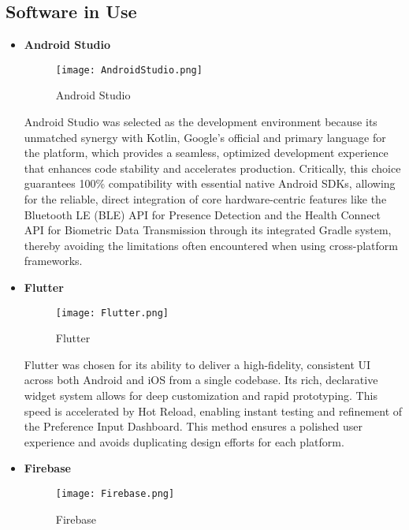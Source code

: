 \documentclass[conference]{IEEEtran}
\begin{document}
\subsection{Software in Use}
\begin{itemize}
    \item \textbf{Android Studio}\par
        \begin{figure}[h]
        \centering
        \texttt{[image: AndroidStudio.png]}
        \centering
        \caption{Android Studio} 
        \end{figure}\par
    Android Studio was selected as the development environment because its unmatched synergy with Kotlin, Google's official and primary language for the platform, which provides a seamless, optimized development experience that enhances code stability and accelerates production. Critically, this choice guarantees 100\% compatibility with essential native Android SDKs, allowing for the reliable, direct integration of core hardware-centric features like the Bluetooth LE (BLE) API for Presence Detection and the Health Connect API for Biometric Data Transmission through its integrated Gradle system, thereby avoiding the limitations often encountered when using cross-platform frameworks.\\[1em]
    \item \textbf{Flutter}\par
        \begin{figure}[h]
        \centering
        \texttt{[image: Flutter.png]}
        \centering
        \caption{Flutter} 
        \end{figure}\par
    Flutter was chosen for its ability to deliver a high-fidelity, consistent UI across both Android and iOS from a single codebase. Its rich, declarative widget system allows for deep customization and rapid prototyping. This speed is accelerated by Hot Reload, enabling instant testing and refinement of the Preference Input Dashboard. This method ensures a polished user experience and avoids duplicating design efforts for each platform.\\[1em]
    \item \textbf{Firebase}\par
        \begin{figure}[h]
        \centering
        \texttt{[image: Firebase.png]}
        \centering
        \caption{Firebase} 

\end{figure}
\end{itemize}
\end{document}
